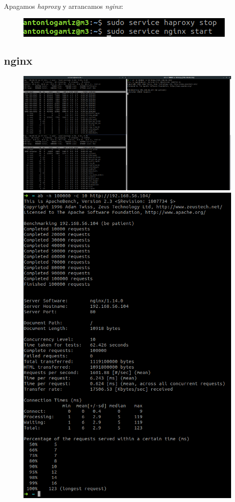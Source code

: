 \documentclass[12pt]{article}
\begin{document}
Apagamos \textit{haproxy} y arrancamos \textit{nginx}:

\begin{figure}[H]
\center
\includegraphics[scale=0.5]{19.png}
\end{figure}

\subsection{nginx}

\begin{figure}[H]
\center
\includegraphics[scale=0.2]{17.png}
\includegraphics[scale=0.3]{18.png}
\end{figure}
\end{document}

